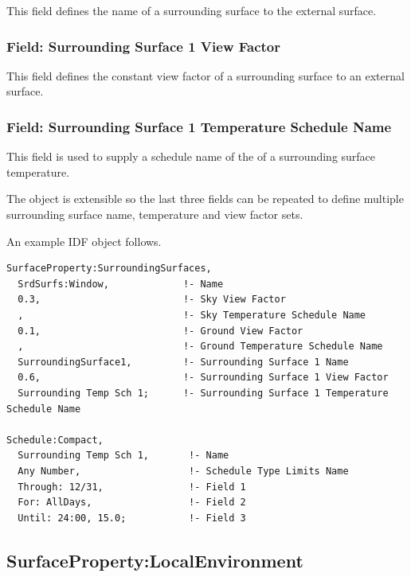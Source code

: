 This field defines the name of a surrounding surface to the external surface.

\subsubsection{Field: Surrounding Surface 1 View Factor}\label{field-surrounding-surface-1-view-factor}

This field defines the constant view factor of a surrounding surface to an external surface.

\subsubsection{Field: Surrounding Surface 1 Temperature Schedule Name}\label{field-surrounding-surface-1-temp-schedule-name}

This field is used to supply a schedule name of the of a surrounding surface temperature.

The object is extensible so the last three fields can be repeated to define multiple surrounding surface name, temperature and view factor sets.

An example IDF object follows.

\begin{lstlisting}
SurfaceProperty:SurroundingSurfaces,
  SrdSurfs:Window,             !- Name
  0.3,                         !- Sky View Factor
  ,                            !- Sky Temperature Schedule Name
  0.1,                         !- Ground View Factor
  ,                            !- Ground Temperature Schedule Name
  SurroundingSurface1,         !- Surrounding Surface 1 Name
  0.6,                         !- Surrounding Surface 1 View Factor
  Surrounding Temp Sch 1;      !- Surrounding Surface 1 Temperature Schedule Name

Schedule:Compact,
  Surrounding Temp Sch 1,       !- Name
  Any Number,                   !- Schedule Type Limits Name
  Through: 12/31,               !- Field 1
  For: AllDays,                 !- Field 2
  Until: 24:00, 15.0;           !- Field 3
\end{lstlisting}

\subsection{SurfaceProperty:LocalEnvironment}\label{surfacePropertylocalEnvironment}

